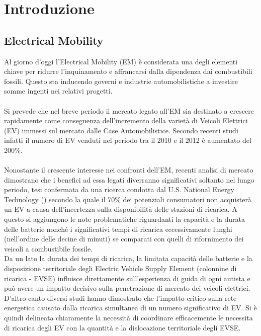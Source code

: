 \chapter{Introduzione}

\section{Electrical Mobility}

Al giorno d'oggi l'Electrical Mobility (EM) è considerata una degli elementi chiave per ridurre l'inquinamento 
e affrancarsi dalla dipendenza dai combustibili fossili. Questo sta inducendo governi e industrie automobilistiche a investire somme ingenti nei relativi progetti. 
\\\\
Si prevede che nel breve periodo il mercato legato all'EM sia destinato a crescere rapidamente come conseguenza dell'incremento della varietà di Veicoli Elettrici (EV) immessi sul mercato dalle Case Automobilistice. Secondo recenti studi infatti il numero di EV venduti nel periodo tra il 2010 e il 2012 è aumentato del 200\%. 
\\\\
Nonostante il crescente interesse nei confronti dell'EM, recenti analisi di mercato dimostrano che i benefici ad essa legati diverranno significativi soltanto nel lungo periodo, tesi confermata da una ricerca condotta dal U.S. National Energy Technology (\cite{katmale2011}) secondo la quale il 70\% dei potenziali consumatori non acquisterà un EV a causa dell'incertezza sulla disponibilità delle stazioni di ricarica. A questo si aggiungono le note problematiche riguardanti la capacità e la durata delle batterie nonché i significativi tempi di ricarica eccessivamente lunghi (nell'ordine delle decine di minuti) se comparati con quelli di rifornimento dei veicoli a combustibile fossile.
\\
Da un lato la durata dei tempi di ricarica, la limitata capacità delle batterie e la disposizione territoriale degli Electric Vehicle Supply Element (colonnine di ricarica - EVSE) influisce direttamente sull'esperienza di guida di ogni autista e può avere un impatto decisivo sulla penetrazione di mercato dei veicoli elettrici. D'altro canto diversi studi hanno dimostrato che l'impatto critico sulla rete energetica causato dalla ricarica simultanea di un numero significativo di EV. Si è quindi delineata chiaramente la necessità di coordinare efficacemente le necessita di ricarica degli EV con la quantità e la dislocazione territoriale degli EVSE.
